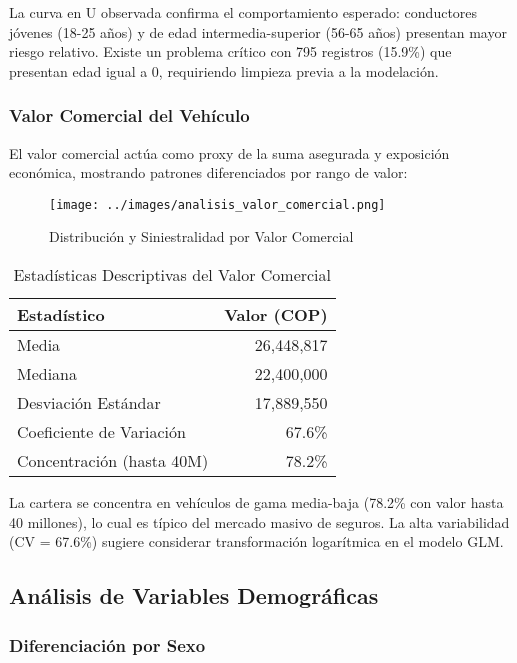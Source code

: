 La curva en U observada confirma el comportamiento esperado: conductores jóvenes (18-25 años) y de edad intermedia-superior (56-65 años) presentan mayor riesgo relativo. Existe un problema crítico con 795 registros (15.9\%) que presentan edad igual a 0, requiriendo limpieza previa a la modelación.

\subsubsection{Valor Comercial del Vehículo}

El valor comercial actúa como proxy de la suma asegurada y exposición económica, mostrando patrones diferenciados por rango de valor:

\begin{figure}[H]
\centering
\texttt{[image: ../images/analisis\_valor\_comercial.png]}
\caption{Distribución y Siniestralidad por Valor Comercial}
\end{figure}

\begin{table}[H]
\centering
\caption{Estadísticas Descriptivas del Valor Comercial}
\begin{tabular}{|l|r|}
\hline
\textbf{Estadístico} & \textbf{Valor (COP)} \\
\hline
Media & 26,448,817 \\
Mediana & 22,400,000 \\
Desviación Estándar & 17,889,550 \\
Coeficiente de Variación & 67.6\% \\
Concentración (hasta 40M) & 78.2\% \\
\hline
\end{tabular}
\end{table}

La cartera se concentra en vehículos de gama media-baja (78.2\% con valor hasta 40 millones), lo cual es típico del mercado masivo de seguros. La alta variabilidad (CV = 67.6\%) sugiere considerar transformación logarítmica en el modelo GLM.

\subsection{Análisis de Variables Demográficas}

\subsubsection{Diferenciación por Sexo}

